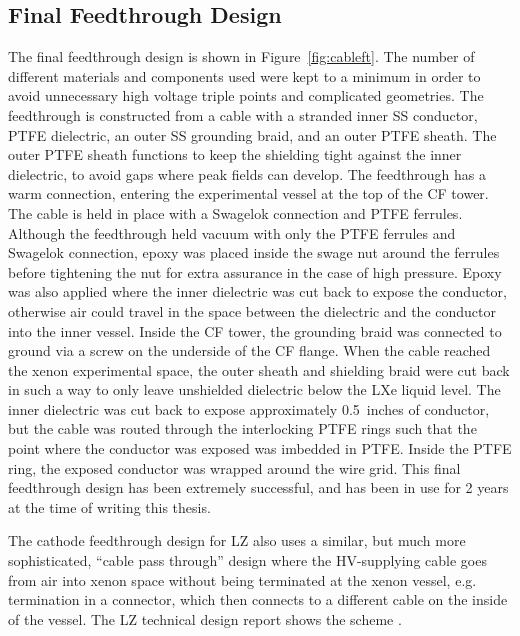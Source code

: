 \subsection{Final Feedthrough Design} 
The final feedthrough design is shown in Figure~\ref{fig:cableft}. The number of different materials and components used were kept to a minimum in order to avoid unnecessary high voltage triple points and complicated geometries. The feedthrough is constructed from a cable with a stranded inner \ac{SS} conductor, \ac{PTFE} dielectric, an outer \ac{SS} grounding braid, and an outer \ac{PTFE} sheath. The outer \ac{PTFE} sheath functions to keep the shielding tight against the inner dielectric, to avoid gaps where peak fields can develop. The feedthrough has a warm connection, entering the experimental vessel at the top of the \ac{CF} tower. The cable is held in place with a Swagelok connection and \ac{PTFE} ferrules. Although the feedthrough held vacuum with only the \ac{PTFE} ferrules and Swagelok connection, epoxy was placed inside the swage nut around the ferrules before tightening the nut for extra assurance in the case of high pressure. Epoxy was also applied where the inner dielectric was cut back to expose the conductor, otherwise air could travel in the space between the dielectric and the conductor into the inner vessel. Inside the \ac{CF} tower, the grounding braid was connected to ground via a screw on the underside of the \ac{CF} flange. When the cable reached the xenon experimental space, the outer sheath and shielding braid were cut back in such a way to only leave unshielded dielectric below the \ac{LXe} liquid level. The inner dielectric was cut back to expose approximately 0.5~inches of conductor, but the cable was routed through the interlocking \ac{PTFE} rings such that the point where the conductor was exposed was imbedded in \ac{PTFE}. Inside the \ac{PTFE} ring, the exposed conductor was wrapped around the wire grid. This final feedthrough design has been extremely successful, and has been in use for 2 years at the time of writing this thesis.  

The cathode feedthrough design for \ac{LZ} also uses a similar, but much more sophisticated, ``cable pass through'' design where the \ac{HV}-supplying cable goes from air into xenon space without being terminated at the xenon vessel, e.g. termination in a connector, which then connects to a different cable on the inside of the vessel. The \ac{LZ} technical design report shows the scheme \cite{LZTDR}.


